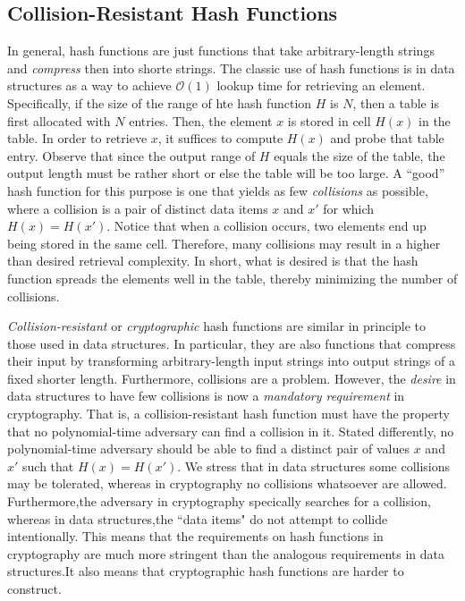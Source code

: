 \subsection{Collision-Resistant Hash Functions}
In general, hash functions are just functions that take arbitrary-length strings and \emph{compress} then into shorte strings. The classic use of hash functions is in data structures as a way to achieve $\mathcal{O}(1)$ lookup time for retrieving an element. Specifically, if the size of the range of hte hash function $H$ is $N$, then a table is first allocated with $N$ entries. Then, the element $x$ is stored in cell $H(x)$ in the table. In order to retrieve $x$, it suffices to compute $H(x)$ and probe that table entry. Observe that since the output range of $H$ equals the size of the table, the output length must be rather short or else the table will be too large. A ``good'' hash function for this purpose is one that yields as few \emph{collisions} as possible, where a collision  is a pair of distinct data items $x$ and $x'$ for which $H(x) = H(x')$. Notice that when a collision occurs, two elements end up being stored in the same cell. Therefore, many collisions may result in a higher than desired retrieval complexity. In short, what is desired is that the hash function spreads the elements well in the table, thereby minimizing the number of collisions\cite{katz_lindell}.

\emph{Collision-resistant} or \emph{cryptographic} hash functions are similar in principle to those used in data structures. In particular, they are also functions that compress their input by transforming arbitrary-length input strings into output strings of a fixed shorter length. Furthermore, collisions are a problem. However, the \emph{desire} in data structures to have few collisions is now a \emph{mandatory requirement} in cryptography. That is, a collision-resistant hash function must have the property that no polynomial-time adversary can find a collision in it. Stated differently, no polynomial-time adversary should be able to find a distinct pair of values $x$ and $x'$ such that $H(x) = H(x')$.
We stress that in data structures some collisions may be tolerated, whereas in cryptography no collisions whatsoever are allowed. Furthermore,the adversary in cryptography specically searches for a collision, whereas in data structures,the ``data items" do not attempt to collide intentionally. This means that the requirements on hash functions in cryptography are much more stringent than the analogous requirements in data structures.It also means that cryptographic hash functions are harder to construct\cite{katz_lindell}.\\

